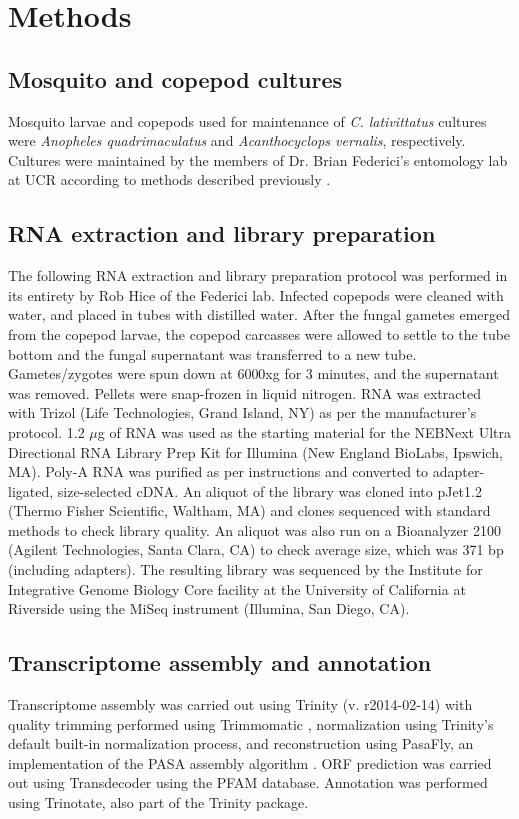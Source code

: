 \section{Methods}
\subsection*{Mosquito and copepod cultures}
Mosquito larvae and copepods used for maintenance of \textit{C. lativittatus} cultures were \textit{Anopheles quadrimaculatus} and \textit{Acanthocyclops vernalis}, respectively. Cultures were maintained by the members of Dr. Brian Federici's entomology lab at UCR according to methods described previously \cite{Federici1983}.\\ 
\subsection*{RNA extraction and library preparation}
The following RNA extraction and library preparation protocol was performed in its entirety by Rob Hice of the Federici lab. Infected copepods were cleaned with water, and placed in tubes with distilled water. After the fungal gametes emerged from the copepod larvae, the copepod carcasses were allowed to settle to the tube bottom and the fungal supernatant was transferred to a new tube. Gametes/zygotes were spun down at 6000xg for 3 minutes, and the supernatant was removed. Pellets were snap-frozen in liquid nitrogen. RNA was extracted with Trizol  (Life Technologies, Grand Island, NY) as per the manufacturer's protocol. 1.2 $\mu$g of RNA was used as the starting material for the NEBNext Ultra Directional RNA Library Prep Kit for Illumina (New England BioLabs, Ipswich, MA). Poly-A RNA was purified as per instructions and converted to adapter-ligated, size-selected cDNA. An aliquot of the library was cloned into pJet1.2 (Thermo Fisher Scientific, Waltham, MA) and clones sequenced with standard methods to check library quality. An aliquot was also run on a Bioanalyzer 2100 (Agilent Technologies, Santa Clara, CA) to check average size, which was 371 bp (including adapters). The resulting library was sequenced by the Institute for Integrative Genome Biology Core facility at the University of California at Riverside using the MiSeq instrument (Illumina, San Diego, CA).\\
\subsection*{Transcriptome assembly and annotation}
Transcriptome assembly was carried out using Trinity (v. r2014-02-14) \cite{Grabherr2011} with quality trimming performed using Trimmomatic \cite{Bolger2014}, normalization using Trinity's default built-in normalization process, and reconstruction using PasaFly, an implementation of the PASA assembly algorithm \cite{Haas2013}. ORF prediction was carried out using Transdecoder \cite{Haas2013} using the PFAM database. Annotation was performed using Trinotate, also part of the Trinity package.\\
